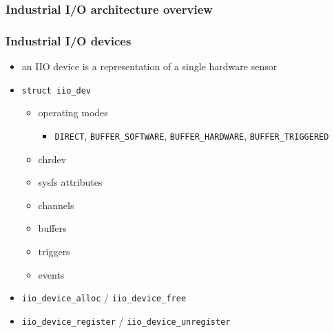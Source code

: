 \documentclass[aspectratio=169]{beamer}
\begin{document}

\begin{frame}
\frametitle{Industrial I/O architecture overview}
\begin{figure}
\end{figure}
\end{frame}


\begin{frame}
\frametitle{Industrial I/O devices}
\begin{itemize}
    \item an IIO device is a representation of a single hardware sensor
    \item \texttt{struct iio\_dev}
    \begin{itemize}
        \item operating modes
        \begin{itemize}
        \item \texttt{DIRECT}, \texttt{BUFFER\_SOFTWARE}, \texttt{BUFFER\_HARDWARE}, \texttt{BUFFER\_TRIGGERED}
        \end{itemize}
        \item chrdev
        \item sysfs attributes
        \item channels
        \item buffers
        \item triggers
        \item events
    \end{itemize}
    \item \texttt{iio\_device\_alloc} / \texttt{iio\_device\_free}
    \item \texttt{iio\_device\_register} / \texttt{iio\_device\_unregister}
\end{itemize}
\end{frame}
\end{document}
